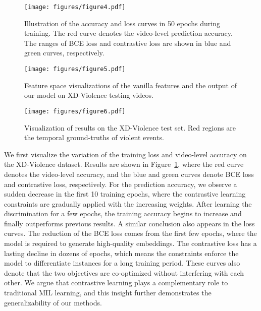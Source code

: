 \documentclass[sigconf]{acmart}
\begin{document}
\begin{figure}[tb]
\centering
\texttt{[image: figures/figure4.pdf]}
\vspace{-2mm}
\caption{Illustration of the accuracy and loss curves in 50 epochs during training. The red curve denotes the video-level prediction accuracy. The ranges of BCE loss and contrastive loss are shown in blue and green curves, respectively.}
\vspace{-2mm}
\label{figure4}
\end{figure}

\begin{figure}[tb]
\centering
\texttt{[image: figures/figure5.pdf]}
\vspace{-2mm}
\caption{Feature space visualizations of the vanilla features and the output of our model on XD-Violence testing videos.}
\vspace{-2mm}
\label{figure5}
\end{figure}

\begin{figure*}[htbp]
\centering
\texttt{[image: figures/figure6.pdf]}
\vspace{-2mm}
\caption{Visualization of results on the XD-Violence test set. Red regions are the temporal ground-truths of violent events.}
\vspace{-3mm}
\label{figure6}
\end{figure*}

We first visualize the variation of the training loss and video-level accuracy on the XD-Violence dataset. Results are shown in Figure~\ref{figure4}, where the red curve denotes the video-level accuracy, and the blue and green curves denote BCE loss and contrastive loss, respectively. For the prediction accuracy, we observe a sudden decrease in the first 10 training epochs, where the contrastive learning constraints are gradually applied with the increasing weights. After learning the discrimination for a few epochs, the training accuracy begins to increase and finally outperforms previous results. A similar conclusion also appears in the loss curves. The reduction of the BCE loss comes from the first few epochs, where the model is required to generate high-quality embeddings. The contrastive loss has a lasting decline in dozens of epochs, which means the constraints enforce the model to differentiate instances for a long training period. These curves also denote that the two objectives are co-optimized without interfering with each other. We argue that contrastive learning plays a complementary role to traditional MIL learning, and this insight further demonstrates the generalizability of our methods.
\end{document}
